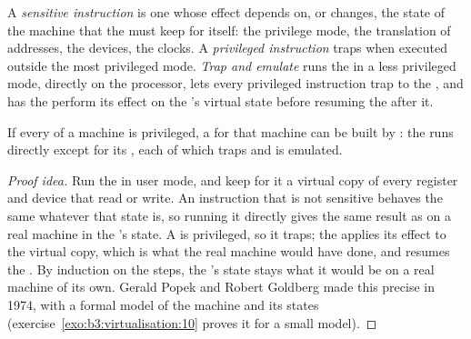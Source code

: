 \begin{definition}\label{def:b3:virtualisation:sensitive}
A \emph{sensitive instruction} is one whose effect depends on, or changes, the state of the machine that the  must keep for itself: the privilege mode, the translation of addresses, the devices, the clocks. A \emph{privileged instruction} traps when executed outside the most privileged mode. \emph{Trap and emulate} runs the  in a less privileged mode, directly on the processor, lets every privileged instruction trap to the , and has the  perform its effect on the 's virtual state before resuming the  after it.
\end{definition}

\begin{theorem}\label{thm:b3:virtualisation:popek-goldberg}
If every  of a machine is privileged, a  for that machine can be built by : the  runs directly except for its , each of which traps and is emulated. %
\end{theorem}

\begin{proof}[Proof idea]
Run the  in user mode, and keep for it a virtual copy of every register and device that  read or write. An instruction that is not sensitive behaves the same whatever that state is, so running it directly gives the same result as on a real machine in the 's state. A  is privileged, so it traps; the  applies its effect to the virtual copy, which is what the real machine would have done, and resumes the . By induction on the steps, the 's state stays what it would be on a real machine of its own. Gerald Popek and Robert Goldberg made this precise in 1974, with a formal model of the machine and its states (exercise~\ref{exo:b3:virtualisation:10} proves it for a small model). %
\end{proof}

